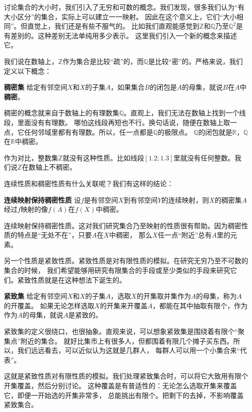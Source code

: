 \documentclass[12pt,UTF8]{ctexbook}
\begin{document}
讨论集合的大小时，我们引入了无穷和可数的概念。我们发现，很多我们认为“有大小区分”的集合，实际上可以建立一一映射。
因此在这个意义上，它们“大小相同”。但直觉上，我们还是有些不服气的。
比如我们直观能感觉到$\mathbb{Z}$和$\mathbb{Q}$乃至$\mathbb{Q}^2$是有差别的。这种差别无法单纯用多少表示。
这里我们引入一个新的概念来描述它。

我们说在数轴上，$\mathbb{Z}$作为集合是比较“疏”的，而$\mathbb{Q}$是比较“密”的。严格来说，我们定义以下概念：
\begin{df}{\textbf{稠密集}}
    给定有邻空间$X$和$X$的子集$A$，如果集合$B$的闭包是$A$的母集，就说$B$在$A$中\textbf{稠密}。
\end{df}

稠密的概念就来自于数轴上的有理数集$\mathbb{Q}$。直观上，我们无法在数轴上找到一个线段，里面没有有理数。
哪怕这线段再短也不行。换句话说，随便在数轴上取一点，它任何邻域里都有有理数。所以，任一点都是$\mathbb{Q}$的极限点。
$\mathbb{Q}$的闭包就是$\mathbb{R}$，$\mathbb{Q}$在$\mathbb{R}$中稠密。

作为对比，整数集$\mathbb{Z}$就没有这种性质。比如线段$[1.2;1.3]$里就没有任何整数。我们说$\mathbb{Z}$在数轴上不稠密。

连续性质和稠密性质有什么关联呢？我们有这样的结论：
\begin{tm}{\textbf{连续映射保持稠密性质}}
    设$f$是有邻空间$X$到有邻空间$Y$的连续映射，则$X$的稠密集$A$经过$f$映射的像$f(A)$在$f(X)$中稠密。
\end{tm}
连续映射保持稠密性质。这对我们研究集合乃至映射的性质很有帮助。因为稠密性质的特点是“无处不在”，只要$A$在$X$中稠密，
那么$X$任一点“附近”总有$A$里的元素。


另一个性质是紧致性质。紧致性质是对有限性质的模拟。在研究无穷乃至不可数的集合的时候，
我们希望能够用研究有限集合的手段或至少类似的手段来研究它们。紧致性质就是在这种想法下诞生的。
\begin{df}{\textbf{紧致集}}
    给定有邻空间$X$和$X$的子集$A$，选取$X$的开集取并集作为$A$的母集，称为$A$的开覆盖。
    如果无论怎样选取$X$的开集来开覆盖$A$，都能在其中抽取有限个，作为作为$A$的母集，就说$A$是紧致的。
\end{df}

紧致集的定义很绕口，也很抽象。直观来说，可以想象紧致集是围绕着有限个“聚集点”附近的集合。
就好比集市上有很多人，但都围着有限几个摊子买东西。所以，我们远远看去，可以近似认为这就是几群人，
每群人可以用一个小集合来“代表”。

这就是紧致性质对有限性质的模拟。我们处理紧致集合时，可以将它大致用有限个开集覆盖，然后分别讨论。
这种覆盖是有普适性的：无论怎么选取开集来覆盖它，即便一开始选的开集非常多，
总能挑出有限个。把剩下的去掉，不影响覆盖紧致集合。
\end{document}
